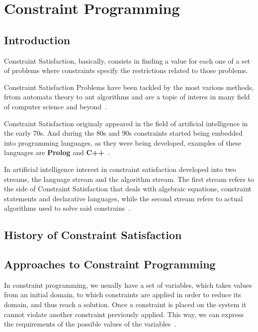 \chapter{Constraint Programming}

\section{Introduction}

Constraint Satisfaction, basically, consists in finding a value for each one of a set of problems where constraints specify the restrictions related to those problems.

Constraint Satisfaction Problems have been tackled by the most various methods, frtom automata theory to ant algorithms and are a topic of interes in many field of computer science and beyond~\cite{Rossi2006}.

Constraint Satisfaction originaly appeared in the field of artificial intelligence in the early 70s. And during the 80s and 90s constraints started being embedded into programming languages, as they were being developed, examples of these languages are \textbf{Prolog} and \textbf{C++}~\cite{Krzysztof2003}.

In artificial intelligence interest in constraint satisfaction developed into two streams, the language stream and the algorithm stream. The first stream refers to the side of Constraint Satisfaction that deals with algebraic equations, constraint statements and declarative languages, while the second stream refers to actual algorithms used to solve said constrains~\cite{Rossi2006}.

\section{History of Constraint Satisfaction}




\section{Approaches to Constraint Programming}

In constraint programming, we usually have a set of variables, which takes values from an initial domain, to which constraints are applied in order to reduce its domain, and thus reach a solution. Once a constraint is placed on the system it cannot violate another constraint previously applied. This way, we can express the requirements of the possible values of the variables~\cite{Pearson1997}.

